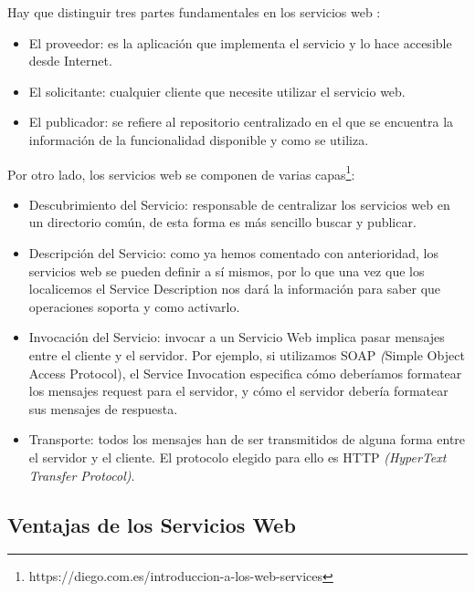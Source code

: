 Hay que distinguir tres partes fundamentales en los servicios web \citep{TorresJoaquin2017SC}:
\begin{itemize}
	\item El proveedor: es la aplicación que implementa el servicio y lo hace accesible desde Internet.
	\item El solicitante: cualquier cliente que necesite utilizar el servicio web.
	\item El publicador: se refiere al repositorio centralizado en el que se encuentra la información de la funcionalidad disponible y como se utiliza.
	
\end{itemize}
Por otro lado, los servicios web se componen de varias capas\footnote{https://diego.com.es/introduccion-a-los-web-services}:
\begin{itemize}
	\item Descubrimiento del Servicio: responsable de centralizar los servicios web en un directorio común, de esta forma es más sencillo buscar y publicar.
	\item Descripción del Servicio: como ya hemos comentado con anterioridad, los servicios web se pueden definir a sí mismos, por lo que una vez que los localicemos el Service Description nos dará la información para saber que operaciones soporta y como activarlo.
	\item Invocación del Servicio: invocar a un Servicio Web implica pasar mensajes entre el cliente y el servidor. Por ejemplo, si utilizamos SOAP  \textit({Simple Object Access Protocol}), el Service Invocation especifica cómo deberíamos formatear los mensajes request para el servidor, y cómo el servidor debería formatear sus mensajes de respuesta.
	\item Transporte: todos los mensajes han de ser transmitidos de alguna forma entre el servidor y el cliente. El protocolo elegido para ello es HTTP \textit{(HyperText Transfer Protocol)}. 
\end{itemize}



\subsection{Ventajas de los  Servicios Web}
\label{cap:subsec:ventajasserviciosweb}

